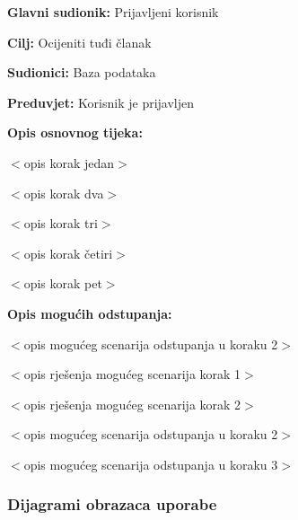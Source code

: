 \noindent {}
\begin{packed_item}

\item \textbf{Glavni sudionik:} Prijavljeni korisnik
\item  \textbf{Cilj:} Ocijeniti tuđi članak
\item  \textbf{Sudionici:} Baza podataka
\item  \textbf{Preduvjet:} Korisnik je prijavljen
\item  \textbf{Opis osnovnog tijeka:}

\item[] \begin{packed_enum}

    \item $<$opis korak jedan$>$
    \item $<$opis korak dva$>$
    \item $<$opis korak tri$>$
    \item $<$opis korak četiri$>$
    \item $<$opis korak pet$>$

\end{packed_enum}

\item  \textbf{Opis mogućih odstupanja:}

\item[] \begin{packed_item}

    \item[2.a] $<$opis mogućeg scenarija odstupanja u koraku 2$>$
    \item[] \begin{packed_enum}

        \item $<$opis rješenja mogućeg scenarija korak 1$>$
        \item $<$opis rješenja mogućeg scenarija korak 2$>$

    \end{packed_enum}

\item[2.b] $<$opis mogućeg scenarija odstupanja u koraku 2$>$
\item[3.a] $<$opis mogućeg scenarija odstupanja  u koraku 3$>$

\end{packed_item}
\end{packed_item}

\subsubsection{Dijagrami obrazaca uporabe}

